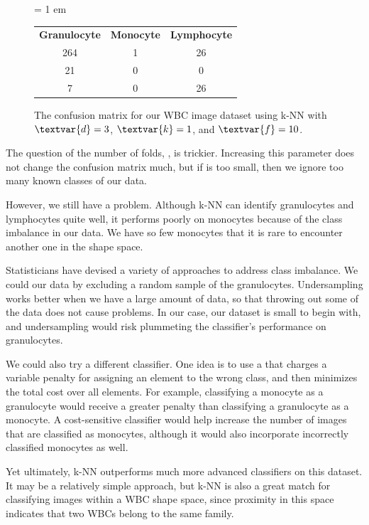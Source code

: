 \begin{figure}[h]
\centering
\tabcolsep = 1 em
\mySfFamily
\begin{tabular}{c c c}
\textbf{Granulocyte} & \textbf{Monocyte} & \textbf{Lymphocyte} \\
264 & 1 & 26 \\
21 & 0 & 0 \\
7 & 0 & 26
\end{tabular}
\caption{The confusion matrix for our WBC image dataset using k-NN with $\textvar{d} = \text{3}$, $\textvar{k} = \text{1}$, and $\textvar{f} = \text{10}$.}
\label{fig:wbc_too_many_neighbors}
\end{figure}

The question of the number of folds, , is trickier. Increasing this parameter does not change the confusion matrix much, but if  is too small, then we ignore too many known classes of our data.

However, we still have a problem. Although k-NN can identify granulocytes and lymphocytes quite well, it performs poorly on monocytes because of the class imbalance in our data. We have so few monocytes that it is rare to encounter another one in the shape space.

Statisticians have devised a variety of approaches to address class imbalance. We could  our data by excluding a random sample of the granulocytes. Undersampling works better when we have a large amount of data, so that throwing out some of the data does not cause problems. In our case, our dataset is small to begin with, and undersampling would risk plummeting the classifier's performance on granulocytes.

We could also try a different classifier. One idea is to use a  that charges a variable penalty for assigning an element to the wrong class, and then minimizes the total cost over all elements. For example, classifying a monocyte as a granulocyte would receive a greater penalty than classifying a granulocyte as a monocyte. A cost-sensitive classifier would help increase the number of images that are classified as monocytes, although it would also incorporate incorrectly classified monocytes as well.

Yet ultimately, k-NN outperforms much more advanced classifiers on this dataset. It may be a relatively simple approach, but k-NN is also a great match for classifying images within a WBC shape space, since proximity in this space indicates that two WBCs belong to the same family.

